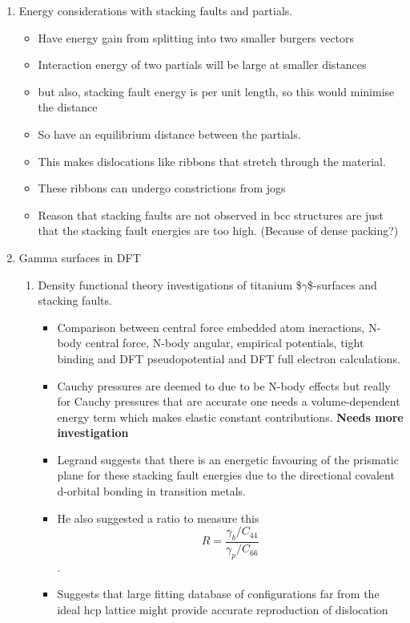 \documentclass[11pt]{article}
\begin{document}
\begin{enumerate}
\item Energy considerations with stacking faults and partials.
\label{sec:org0d059dd}
\begin{itemize}
\item Have energy gain from splitting into two smaller burgers vectors
\item Interaction energy of two partials will be large at smaller distances
\item but also, stacking fault energy is per unit length, so this would
minimise the distance
\item So have an equilibrium distance between the partials.
\item This makes dislocations like ribbons that stretch through the material.
\item These ribbons can undergo constrictions from jogs
\item Reason that stacking faults are not observed in bcc structures are just
that the stacking fault energies are too high. (Because of dense packing?)
\end{itemize}
\item Gamma surfaces in DFT
\label{sec:org2a0a907}
\begin{enumerate}
\item{} \cite{Benoit_2012} Density functional theory investigations of titanium \$\(\gamma\)\$-surfaces and stacking faults.
\label{sec:org4a898a6}
\begin{itemize}
\item Comparison between central force  embedded atom ineractions, N-body
central force, N-body angular, empirical potentials, tight binding and
DFT pseudopotential and DFT full electron calculations.
\item Cauchy pressures are deemed to due to be N-body effects but really for Cauchy
pressures that are accurate one needs a volume-dependent energy term
which makes elastic constant contributions. \textbf{\textbf{Needs more investigation}}
\item Legrand suggests that there is an energetic favouring of the prismatic
plane for these stacking fault energies due to the directional covalent
d-orbital bonding in transition metals.
\item He also suggested a ratio to measure this \[ R = \frac{\gamma_{b}/C_{44}}{\gamma_{p}/C_{66}} \].
\item Suggests that large fitting database of configurations far from the
ideal hcp lattice might provide accurate reproduction of dislocation

\end{itemize}
\end{enumerate}
\end{enumerate}
\end{document}
